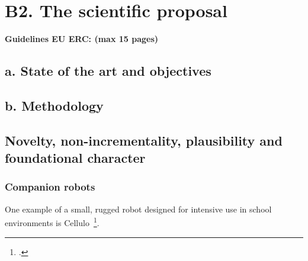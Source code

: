 \documentclass[11pt]{article}
\newcommand{\eu}[1]{{\color{teal}\textbf{Guidelines EU ERC: #1}}}
\begin{document}
\newpage

\section{B2. The scientific proposal}\label{part-b2-the-scientific-proposal}

\eu{(max 15 pages)}

\hypertarget{a.-state-of-the-art-and-objectives}{%
\subsection{a. State of the art and
objectives}\label{a.-state-of-the-art-and-objectives}}

\hypertarget{b.-methodology}{%
\subsection{b. Methodology}\label{b.-methodology}}

\subsection{Novelty, non-incrementality, plausibility and foundational character}

\subsubsection{Companion robots}

One example of a small, rugged robot designed for intensive use in school
environments is Cellulo~\footcite{ozgur2017cellulo}.
\end{document}

